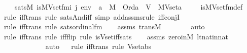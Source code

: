 \begin{isabellebody}
\ \ \ {\isachardoublequoteopen}sats{\isacharparenleft}{\kern0pt}M{\isacharcomma}{\kern0pt}\ is{\isacharunderscore}{\kern0pt}MVset{\isacharunderscore}{\kern0pt}fm{\isacharparenleft}{\kern0pt}i{\isacharcomma}{\kern0pt}\ j{\isacharparenright}{\kern0pt}{\isacharcomma}{\kern0pt}\ env{\isacharparenright}{\kern0pt}\ {\isasymlongleftrightarrow}\ {\isacharparenleft}{\kern0pt}a\ {\isasymin}\ M\ {\isasymand}\ Ord{\isacharparenleft}{\kern0pt}a{\isacharparenright}{\kern0pt}{\isacharparenright}{\kern0pt}\ {\isasymand}\ V\ {\isacharequal}{\kern0pt}\ MVset{\isacharparenleft}{\kern0pt}a{\isacharparenright}{\kern0pt}{\isachardoublequoteclose}\ \isanewline
%
\isadelimproof
\isanewline
\ \ %
\endisadelimproof
%
\isatagproof
{}\isamarkupfalse%
\ is{\isacharunderscore}{\kern0pt}MVset{\isacharunderscore}{\kern0pt}fm{\isacharunderscore}{\kern0pt}def\ \isanewline
\ \ \isamarkupfalse%
{\isacharparenleft}{\kern0pt}rule\ iff{\isacharunderscore}{\kern0pt}trans{\isacharcomma}{\kern0pt}\ rule\ sats{\isacharunderscore}{\kern0pt}And{\isacharunderscore}{\kern0pt}iff{\isacharcomma}{\kern0pt}\ simp\ add{\isacharcolon}{\kern0pt}assms{\isacharcomma}{\kern0pt}rule\ iff{\isacharunderscore}{\kern0pt}conjI{}{\isacharparenright}{\kern0pt}\ \isanewline
\ \ \ \isamarkupfalse%
{\isacharparenleft}{\kern0pt}rule\ iff{\isacharunderscore}{\kern0pt}trans{\isacharcomma}{\kern0pt}\ rule\ sats{\isacharunderscore}{\kern0pt}ordinal{\isacharunderscore}{\kern0pt}fm{\isacharparenright}{\kern0pt}\isanewline
\ \ \isamarkupfalse%
\ assms\ trans{\isacharunderscore}{\kern0pt}M\isanewline
\ \ \ \ \ \ \isamarkupfalse%
\ auto{\isacharbrackleft}{\kern0pt}{}{\isacharbrackright}{\kern0pt}\isanewline
\ \ \isamarkupfalse%
{\isacharparenleft}{\kern0pt}rule\ iff{\isacharunderscore}{\kern0pt}trans{\isacharcomma}{\kern0pt}\ rule\ iff{\isacharunderscore}{\kern0pt}flip{\isacharcomma}{\kern0pt}\ rule\ is{\isacharunderscore}{\kern0pt}Vset{\isacharunderscore}{\kern0pt}iff{\isacharunderscore}{\kern0pt}sats{\isacharparenright}{\kern0pt}\isanewline
\ \ \isamarkupfalse%
\ assms\ zero{\isacharunderscore}{\kern0pt}in{\isacharunderscore}{\kern0pt}M\ lt{\isacharunderscore}{\kern0pt}nat{\isacharunderscore}{\kern0pt}in{\isacharunderscore}{\kern0pt}nat\isanewline
\ \ \ \ \ \ \ \ \ \ \isamarkupfalse%
\ auto{\isacharbrackleft}{\kern0pt}{}{\isacharbrackright}{\kern0pt}\isanewline
\ \ \isamarkupfalse%
{\isacharparenleft}{\kern0pt}rule\ iff{\isacharunderscore}{\kern0pt}trans{\isacharcomma}{\kern0pt}\ rule\ Vset{\isacharunderscore}{\kern0pt}abs{\isacharparenright}{\kern0pt}\isanewline

\end{isabellebody}
